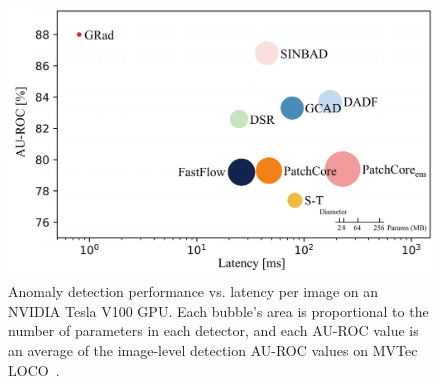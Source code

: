 \documentclass[letterpaper]{article} %
\begin{document}
\begin{figure}[!t]
    \centering
    \includegraphics[width=1\linewidth]{images/speed.pdf}
    \caption{Anomaly detection performance vs. latency per image on an NVIDIA Tesla V100 GPU. Each bubble’s area is proportional to the number of parameters in each detector, and each AU-ROC value is an average of the image-level detection AU-ROC values on MVTec LOCO~\cite{MVloco}.}
    \label{fig: speed}
\end{figure}
\end{document}
